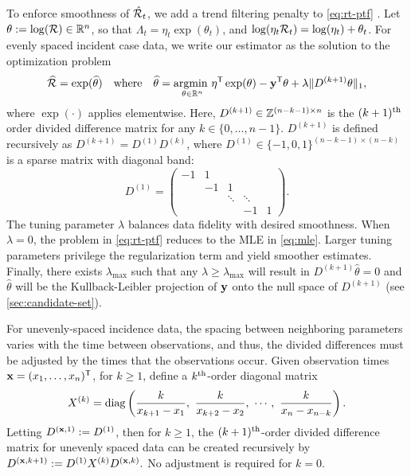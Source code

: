 To enforce smoothness of $\hat{\mathcal{R}}_t$, we add a trend filtering penalty to
\eqref{eq:rt-ptf}
\citep{kim2009ell_1,tibshirani2014adaptive,tibshirani2022divided,sadhanala2022exponential}.
Let $\theta := \log(\mathcal{R}) \in \mathbb{R}^n$, so that $\Lambda_t =
\eta_t \exp(\theta_t)$, and $\log(\eta_t \mathcal{R}_t) = \log(\eta_t) +
\theta_t$. For evenly spaced incident case data, we
write our estimator as the solution to the optimization problem
\begin{equation} 
  \label{eq:rt-ptf}
  \widehat{\mathcal{R}} = \exp(\widehat{\theta}) \quad\textrm{where}\quad \widehat{\theta} = \underset{\theta\in\mathbb{R}^n}{\operatorname*{argmin}\ } \eta^{\mathsf{T}} \exp(\theta) - \mathbf{y}^{\mathsf{T}} \theta + \lambda \lVert D^{(k+1)} \theta \rVert_1,
\end{equation}
where $\exp(\cdot)$ applies elementwise.
Here, $D^{(k+1)} \in \mathbb{Z}^{(n-k-1)\times n}$ is the $(k+1)^{\textnormal{th}}$ order divided
difference matrix for any $k \in \{0,\ldots,n-1\}$. $D^{(k+1)}$ is defined recursively as
$D^{(k+1)} = D^{(1)} D^{(k)}$, where $D^{(1)} \in \{-1,0,1\}^{(n-k-1)\times
(n-k)}$ is a sparse matrix with diagonal band: 
$$D^{(1)} = \begin{pmatrix} 
  -1 & 1 &  & & \\ 
  & -1 & 1 & & \\ 
  & & \ddots & \ddots & \\
  & & & -1 & 1 
\end{pmatrix}.$$ 
The tuning parameter $\lambda$ balances data
fidelity with desired smoothness. When $\lambda=0$, the problem in
\eqref{eq:rt-ptf} reduces to the MLE in \eqref{eq:mle}. Larger tuning parameters
privilege the regularization term and yield smoother estimates. Finally, there
exists $\lambda_{\textrm{max}}$ such that any $\lambda \geq
\lambda_{\textrm{max}}$ will result in $D^{(k+1)} \widehat {\theta} = 0$ and
$\widehat{\theta}$ will be the Kullback-Leibler projection of $\mathbf{y}$ onto the
null space of $D^{(k+1)}$ (see \autoref{sec:candidate-set}).

For unevenly-spaced incidence data, the spacing between neighboring parameters
varies with the time between observations, and thus, the divided differences
must be adjusted by the times that the observations occur. Given observation
times $\mathbf{x} = (x_1,\dots,x_n)^{\mathsf{T}}$, for $k \geq 1$, define a $k^{\textnormal{th}}$-order
diagonal matrix $$X^{(k)} = \operatorname*{diag} \left(\frac{k}{x_{k+1} - x_1},\ \frac{k}{x_{k+2}
- x_2},\ \cdots,\ \frac{k}{x_n - x_{n-k}} \right).$$ Letting $D^{(\mathbf{x},1)} := D^{(1)}$,
then for $k\geq 1$, the $(k+1)^{\textnormal{th}}$-order divided difference matrix for unevenly
spaced data can be created recursively by
$D^{(\mathbf{x}, k+1)} := D^{(1)} X^{(k)} D^{(\mathbf{x},k)}.$ No adjustment is required
for $k=0$. 

